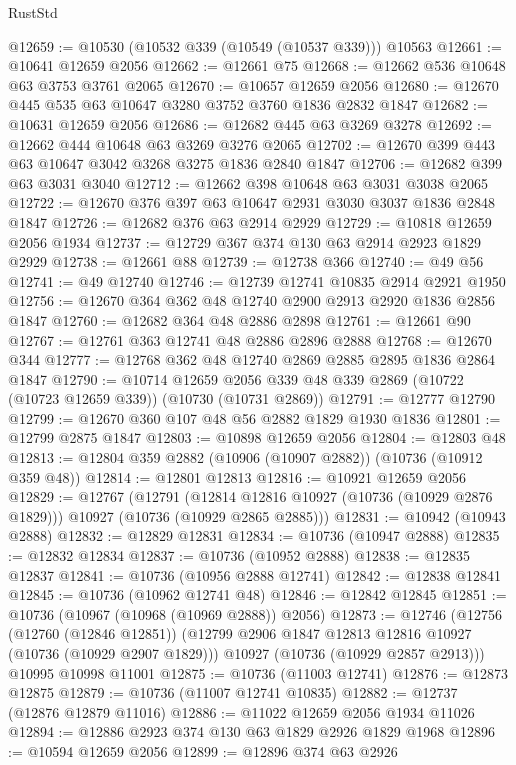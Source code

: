 \begin{lexlean}{RustStd}
\begin{coremodule}
@12659 := @10530 (@10532 @339 (@10549 (@10537 @339))) @10563
@12661 := @10641 @12659 @2056
@12662 := @12661 @75
@12668 := @12662 @536 @10648 @63 @3753 @3761 @2065
@12670 := @10657 @12659 @2056
@12680 := @12670 @445 @535 @63 @10647 @3280 @3752 @3760 @1836 @2832 @1847
@12682 := @10631 @12659 @2056
@12686 := @12682 @445 @63 @3269 @3278
@12692 := @12662 @444 @10648 @63 @3269 @3276 @2065
@12702 := @12670 @399 @443 @63 @10647 @3042 @3268 @3275 @1836 @2840 @1847
@12706 := @12682 @399 @63 @3031 @3040
@12712 := @12662 @398 @10648 @63 @3031 @3038 @2065
@12722 := @12670 @376 @397 @63 @10647 @2931 @3030 @3037 @1836 @2848 @1847
@12726 := @12682 @376 @63 @2914 @2929
@12729 := @10818 @12659 @2056 @1934
@12737 := @12729 @367 @374 @130 @63 @2914 @2923 @1829 @2929
@12738 := @12661 @88
@12739 := @12738 @366
@12740 := @49 @56
@12741 := @49 @12740
@12746 := @12739 @12741 @10835 @2914 @2921 @1950
@12756 := @12670 @364 @362 @48 @12740 @2900 @2913 @2920 @1836 @2856 @1847
@12760 := @12682 @364 @48 @2886 @2898
@12761 := @12661 @90
@12767 := @12761 @363 @12741 @48 @2886 @2896 @2888
@12768 := @12670 @344
@12777 := @12768 @362 @48 @12740 @2869 @2885 @2895 @1836 @2864 @1847
@12790 := @10714
    @12659
    @2056
    @339
    @48
    @339
    @2869
    (@10722 (@10723 @12659 @339))
    (@10730 (@10731 @2869))
@12791 := @12777 @12790
@12799 := @12670 @360 @107 @48 @56 @2882 @1829 @1930 @1836
@12801 := @12799 @2875 @1847
@12803 := @10898 @12659 @2056
@12804 := @12803 @48
@12813 := @12804 @359 @2882 (@10906 (@10907 @2882)) (@10736 (@10912 @359 @48))
@12814 := @12801 @12813
@12816 := @10921 @12659 @2056
@12829 := @12767
    (@12791
      (@12814 @12816 @10927 (@10736 (@10929 @2876 @1829)))
      @10927
      (@10736 (@10929 @2865 @2885)))
@12831 := @10942 (@10943 @2888)
@12832 := @12829 @12831
@12834 := @10736 (@10947 @2888)
@12835 := @12832 @12834
@12837 := @10736 (@10952 @2888)
@12838 := @12835 @12837
@12841 := @10736 (@10956 @2888 @12741)
@12842 := @12838 @12841
@12845 := @10736 (@10962 @12741 @48)
@12846 := @12842 @12845
@12851 := @10736 (@10967 (@10968 (@10969 @2888)) @2056)
@12873 := @12746
    (@12756
      (@12760 (@12846 @12851))
      (@12799 @2906 @1847 @12813 @12816 @10927 (@10736 (@10929 @2907 @1829)))
      @10927
      (@10736 (@10929 @2857 @2913)))
    @10995
    @10998
    @11001
@12875 := @10736 (@11003 @12741)
@12876 := @12873 @12875
@12879 := @10736 (@11007 @12741 @10835)
@12882 := @12737 (@12876 @12879 @11016)
@12886 := @11022 @12659 @2056 @1934 @11026
@12894 := @12886 @2923 @374 @130 @63 @1829 @2926 @1829 @1968
@12896 := @10594 @12659 @2056
@12899 := @12896 @374 @63 @2926

\end{coremodule}
\end{lexlean}
